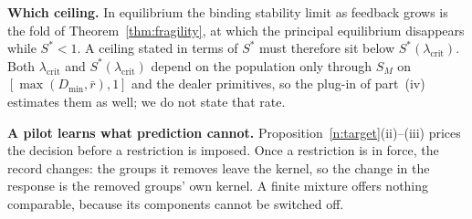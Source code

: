 \documentclass[11pt,letterpaper]{article}
\theoremstyle{definition}
\begin{document}
\textbf{Which ceiling.} In equilibrium the binding stability limit as feedback grows is the fold of Theorem~\ref{thm:fragility}, at which the principal equilibrium disappears while $S^* < 1$. A ceiling stated in terms of $S^*$ must therefore sit below $S^*(\lambda_{\mathrm{crit}})$. Both $\lambda_{\mathrm{crit}}$ and $S^*(\lambda_{\mathrm{crit}})$ depend on the population only through $S_M$ on $[\max(D_{\min}, \bar r), 1]$ and the dealer primitives, so the plug-in of part~(iv) estimates them as well; we do not state that rate.

\textbf{A pilot learns what prediction cannot.} Proposition~\ref{n:target}(ii)--(iii) prices the decision before a restriction is imposed. Once a restriction is in force, the record changes: the groups it removes leave the kernel, so the change in the response is the removed groups' own kernel. A finite mixture offers nothing comparable, because its components cannot be switched off.
\end{document}
